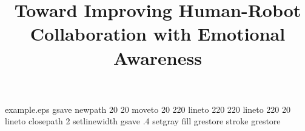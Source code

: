 %
%
%
%
%
\begin{filecontents*}{example.eps}
gsave
newpath
  20 20 moveto
  20 220 lineto
  220 220 lineto
  220 20 lineto
closepath
2 setlinewidth
gsave
  .4 setgray fill
grestore
stroke
grestore
\end{filecontents*}
%
\RequirePackage{fix-cm}
%
\documentclass[smallextended]{svjour3}       %
%
\smartqed  %
%
\usepackage{graphicx}
\usepackage{varwidth}
\usepackage{setspace}
\usepackage{perpage}
\usepackage{enumerate}
%
%
%
%
%

\raggedbottom



\title{Toward Improving Human-Robot Collaboration with Emotional Awareness}%



